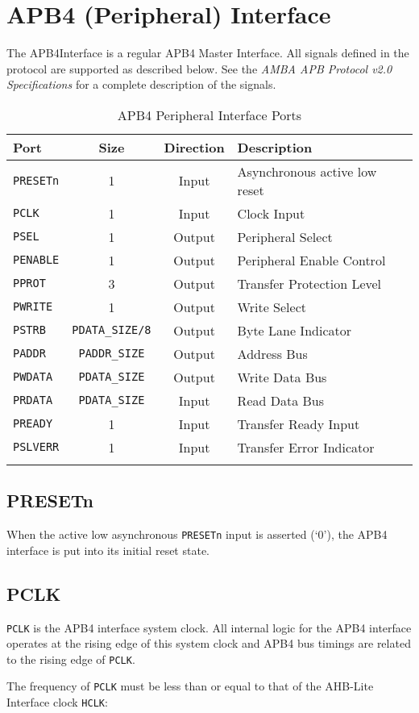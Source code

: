\section{APB4 (Peripheral)
Interface}\label{apb4-peripheral-interface}

The APB4Interface is a regular APB4 Master Interface. All signals
defined in the protocol are supported as described below. See the
\emph{AMBA APB Protocol v2.0 Specifications} for a complete description
of the signals.

\begin{longtable}[]{@{}lccl@{}}
\toprule
Port & Size & Direction & Description\tabularnewline
\midrule
\endhead
\texttt{PRESETn} & 1 & Input & Asynchronous active low reset\tabularnewline
\texttt{PCLK} & 1 & Input & Clock Input\tabularnewline
\texttt{PSEL} & 1 & Output & Peripheral Select\tabularnewline
\texttt{PENABLE} & 1 & Output & Peripheral Enable Control\tabularnewline
\texttt{PPROT} & 3 & Output & Transfer Protection Level\tabularnewline
\texttt{PWRITE} & 1 & Output & Write Select\tabularnewline
\texttt{PSTRB} & \texttt{PDATA\_SIZE/8} & Output & Byte Lane Indicator\tabularnewline
\texttt{PADDR} & \texttt{PADDR\_SIZE} & Output & Address Bus\tabularnewline
\texttt{PWDATA} & \texttt{PDATA\_SIZE} & Output & Write Data Bus\tabularnewline
\texttt{PRDATA} & \texttt{PDATA\_SIZE} & Input & Read Data Bus\tabularnewline
\texttt{PREADY} & 1 & Input & Transfer Ready Input\tabularnewline
\texttt{PSLVERR} & 1 & Input & Transfer Error Indicator\tabularnewline
\bottomrule
\caption{APB4 Peripheral Interface Ports}
\end{longtable}

\subsection{PRESETn}\label{presetn}

When the active low asynchronous \texttt{PRESETn} input is asserted (`0'), the
APB4 interface is put into its initial reset state.

\subsection{PCLK}\label{pclk}

\texttt{PCLK} is the APB4 interface system clock. All internal logic for the APB4
interface operates at the rising edge of this system clock and APB4 bus
timings are related to the rising edge of \texttt{PCLK}.

The frequency of \texttt{PCLK} must be less than or equal to that of the AHB-Lite
Interface clock \texttt{HCLK}:

